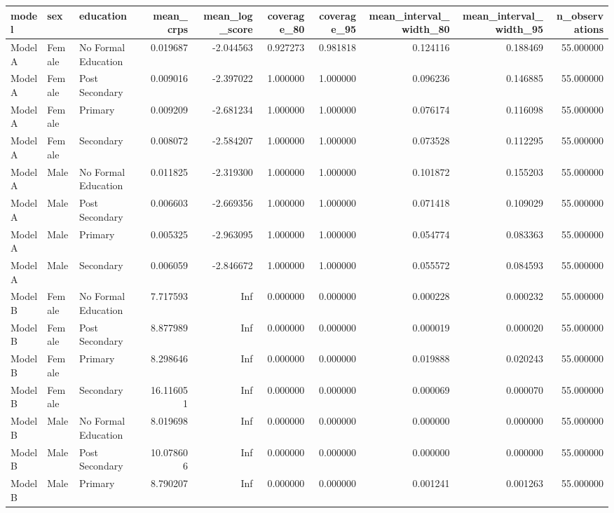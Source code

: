 \begin{table}[ht]
\centering
\begin{tabular}{lllrrrrrrr}
\hline
model & sex & education & mean_crps & mean_log_score & coverage_80 & coverage_95 & mean_interval_width_80 & mean_interval_width_95 & n_observations \\
\hline
Model A & Female & No Formal Education & 0.019687 & -2.044563 & 0.927273 & 0.981818 & 0.124116 & 0.188469 & 55.000000 \\
Model A & Female & Post Secondary & 0.009016 & -2.397022 & 1.000000 & 1.000000 & 0.096236 & 0.146885 & 55.000000 \\
Model A & Female & Primary & 0.009209 & -2.681234 & 1.000000 & 1.000000 & 0.076174 & 0.116098 & 55.000000 \\
Model A & Female & Secondary & 0.008072 & -2.584207 & 1.000000 & 1.000000 & 0.073528 & 0.112295 & 55.000000 \\
Model A & Male & No Formal Education & 0.011825 & -2.319300 & 1.000000 & 1.000000 & 0.101872 & 0.155203 & 55.000000 \\
Model A & Male & Post Secondary & 0.006603 & -2.669356 & 1.000000 & 1.000000 & 0.071418 & 0.109029 & 55.000000 \\
Model A & Male & Primary & 0.005325 & -2.963095 & 1.000000 & 1.000000 & 0.054774 & 0.083363 & 55.000000 \\
Model A & Male & Secondary & 0.006059 & -2.846672 & 1.000000 & 1.000000 & 0.055572 & 0.084593 & 55.000000 \\
Model B & Female & No Formal Education & 7.717593 & Inf & 0.000000 & 0.000000 & 0.000228 & 0.000232 & 55.000000 \\
Model B & Female & Post Secondary & 8.877989 & Inf & 0.000000 & 0.000000 & 0.000019 & 0.000020 & 55.000000 \\
Model B & Female & Primary & 8.298646 & Inf & 0.000000 & 0.000000 & 0.019888 & 0.020243 & 55.000000 \\
Model B & Female & Secondary & 16.116051 & Inf & 0.000000 & 0.000000 & 0.000069 & 0.000070 & 55.000000 \\
Model B & Male & No Formal Education & 8.019698 & Inf & 0.000000 & 0.000000 & 0.000000 & 0.000000 & 55.000000 \\
Model B & Male & Post Secondary & 10.078606 & Inf & 0.000000 & 0.000000 & 0.000000 & 0.000000 & 55.000000 \\
Model B & Male & Primary & 8.790207 & Inf & 0.000000 & 0.000000 & 0.001241 & 0.001263 & 55.000000 \\

\end{tabular}
\end{table}
